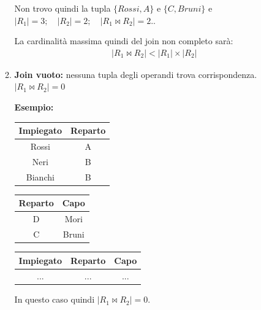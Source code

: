 \documentclass{article}
\begin{document}
\begin{itemize}
\begin{enumerate}
Non trovo quindi la tupla $\{Rossi,A\}$ e $\{C,Bruni\}$ e $    |R_1| = 3; \quad |R_2| = 2; \quad |R_1 \bowtie R_2| = 2.
$.
\vspace{1em}

La cardinalità massima quindi del join non completo sarà:
\begin{align*}
    |R_1 \bowtie R_2| < |R_1| \times |R_2|
\end{align*}

\item \textbf{Join vuoto:} nessuna tupla degli operandi trova corrispondenza. $|R_1 \bowtie R_2| = 0  $

    
\textbf{Esempio:}

\begin{minipage}{.25\textwidth}
  \centering
    \begin{tabular}{|c|c|}
        \hline
        \textbf{Impiegato} & \textbf{Reparto} \\
        \hline
        Rossi & A \\
        \hline
        Neri &  B \\
        \hline
        Bianchi & B \\
         \hline
        \end{tabular}
\end{minipage}%
\hfill
\begin{minipage}{.25\textwidth}
  \centering
       \begin{tabular}{|c|c|}
        \hline
        \textbf{Reparto} & \textbf{Capo} \\
        \hline
        D & Mori\\
        \hline
        C & Bruni\\
         \hline
        \end{tabular}
\end{minipage}
\hfill
\begin{minipage}{.25\textwidth}
  \centering
       \begin{tabular}{|c|c|c|}
        \hline
        \textbf{Impiegato} & \textbf{Reparto} & \textbf{Capo} \\
        \hline
        ... & ... & ... \\
         \hline
        \end{tabular}
\hspace{1em}
\end{minipage}

In questo caso quindi $|R_1 \bowtie R_2| = 0$.


\end{enumerate}
\end{itemize}
\end{document}
